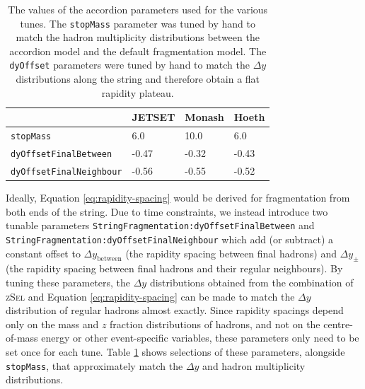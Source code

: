 \documentclass[12pt,a4paper]{report}
\begin{document}
\begin{table}
  \centering
  \begin{tabular}{l|lll}
    & \textbf{JETSET} & \textbf{Monash} & \textbf{Hoeth} \\ \hline
    \texttt{stopMass}               & 6.0             & 10.0            & 6.0            \\
    \texttt{dyOffsetFinalBetween}   & -0.47          & -0.32           & -0.43          \\
    \texttt{dyOffsetFinalNeighbour} & -0.56           & -0.55           & -0.52         
  \end{tabular}
  \caption{The values of the accordion parameters used for the various tunes. The \texttt{stopMass} parameter was tuned by hand to match the hadron multiplicity distributions between the accordion model and the default fragmentation model. The \texttt{dyOffset} parameters were tuned by hand to match the $\Delta y$ distributions along the string and therefore obtain a flat rapidity plateau.}
  \label{tab:accordion-tunes}
\end{table}

\begin{sloppypar} Ideally, Equation \eqref{eq:rapidity-spacing} would be derived for fragmentation from both ends of the string. Due to time constraints, we instead introduce two tunable parameters \texttt{StringFragmentation:dyOffsetFinalBetween} and \texttt{StringFragmentation:dyOffsetFinalNeighbour} which add (or subtract) a constant offset to $\Delta y_\text{between}$ (the rapidity spacing between final hadrons) and $\Delta y_\pm$ (the rapidity spacing between final hadrons and their regular neighbours). By tuning these parameters, the $\Delta y$ distributions obtained from the combination of \textsc{zSel} and Equation \eqref{eq:rapidity-spacing} can be made to match the $\Delta y$ distribution of regular hadrons almost exactly. Since rapidity spacings depend only on the mass and $z$ fraction distributions of hadrons, and not on the centre-of-mass energy or other event-specific variables, these parameters only need to be set once for each tune. Table \ref{tab:accordion-tunes} shows selections of these parameters, alongside \texttt{stopMass}, that approximately match the $\Delta y$ and hadron multiplicity distributions. \end{sloppypar}
\end{document}

